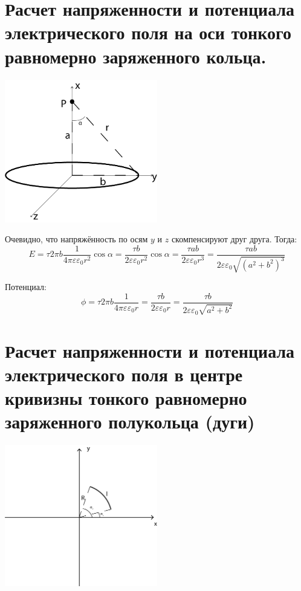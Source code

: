 \documentclass[12pt]{report}
\begin{document}
\section{Расчет напряженности и потенциала электрического поля на оси тонкого равномерно заряженного кольца.}
\begin{center}
    \includegraphics[width=0.5\textwidth]{graphics/t02.png}
\end{center}
Очевидно, что напряжённость по осям $y$ и $z$ скомпенсируют друг друга. Тогда:
\[
    E = \tau 2\pi b \dfrac{1}{4\pi \varepsilon\varepsilon_0 r^2} \cos \alpha
    = \dfrac{\tau b}{2\varepsilon\varepsilon_0 r^2} \cos \alpha
    = \dfrac{\tau ab}{2\varepsilon\varepsilon_0 r^3}
    = \dfrac{\tau ab}{2\varepsilon\varepsilon_0 \sqrt{(a^2 + b^2)^3}}
\]

Потенциал:
\[
    \phi = \tau 2\pi b \dfrac{1}{4\pi \varepsilon\varepsilon_0 r}
    = \dfrac{\tau b}{2\varepsilon\varepsilon_0 r}
    = \dfrac{\tau b}{2 \varepsilon \varepsilon_0 \sqrt{a^2 + b^2}}
\]

\section{Расчет напряженности и потенциала электрического поля в центре кривизны тонкого равномерно заряженного полукольца (дуги)}
\begin{center}
    \includegraphics[width=0.5\textwidth]{graphics/t03.png}
\end{center}
\end{document}
